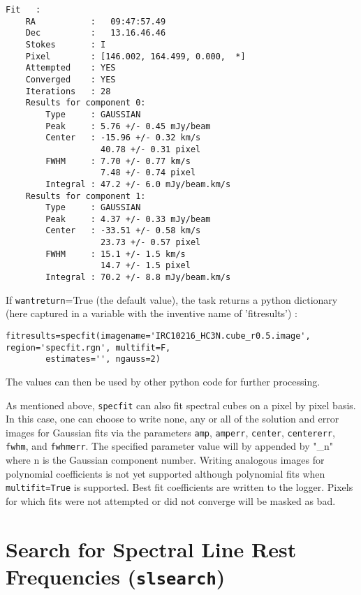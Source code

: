 \small
\begin{verbatim}
Fit   :
    RA           :   09:47:57.49
    Dec          :   13.16.46.46
    Stokes       : I
    Pixel        : [146.002, 164.499, 0.000,  *]
    Attempted    : YES
    Converged    : YES
    Iterations   : 28
    Results for component 0:
        Type     : GAUSSIAN
        Peak     : 5.76 +/- 0.45 mJy/beam
        Center   : -15.96 +/- 0.32 km/s
                   40.78 +/- 0.31 pixel
        FWHM     : 7.70 +/- 0.77 km/s
                   7.48 +/- 0.74 pixel
        Integral : 47.2 +/- 6.0 mJy/beam.km/s
    Results for component 1:
        Type     : GAUSSIAN
        Peak     : 4.37 +/- 0.33 mJy/beam
        Center   : -33.51 +/- 0.58 km/s
                   23.73 +/- 0.57 pixel
        FWHM     : 15.1 +/- 1.5 km/s
                   14.7 +/- 1.5 pixel
        Integral : 70.2 +/- 8.8 mJy/beam.km/s
\end{verbatim}
\normalsize

If {\tt wantreturn}=True (the default value), the task
returns a python dictionary (here captured in a variable
with the inventive name of 'fitresults') : 

\small
\begin{verbatim}
fitresults=specfit(imagename='IRC10216_HC3N.cube_r0.5.image', region='specfit.rgn', multifit=F,
        estimates='', ngauss=2)
\end{verbatim}
\normalsize

The values can then be used by other python code for further
processing. 

As mentioned above, {\tt specfit} can also fit spectral cubes on a
pixel by pixel basis. In this case, one can choose to write none, any
or all of the solution and error images for Gaussian fits via the
parameters {\tt amp}, {\tt amperr}, {\tt center}, {\tt centererr},
{\tt fwhm}, and {\tt fwhmerr}. The
specified parameter value will by appended by "\_n" where n is the
Gaussian component number. Writing analogous images for polynomial
coefficients is not yet supported although polynomial fits when {\tt
  multifit=True} is supported. Best fit coefficients are written to the
logger. Pixels for which fits were not attempted or did not converge
will be masked as bad.
 





\section{Search for Spectral Line Rest Frequencies ({\tt slsearch})}
\label{section:analysis.slsearch}

